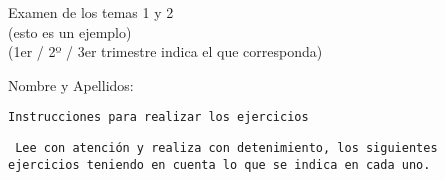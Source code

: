 \documentclass[12pt,a4papper,addpoints]{exam}
\begin{document}
%
%
\begin{center}
\Large{
Examen de los temas 1 y 2 \\ (esto es un ejemplo)
} \\
\vspace*{0.5cm}
\normalsize %
(1er / 2º / 3er trimestre indica el que corresponda)
\vspace*{0.5cm}
\\
%
\vspace{1.10cm}
	\begin{flushleft}
	Nombre y Apellidos: \hrulefill\\
	\vspace*{0.50cm}
		\begin{center}
		\small{\texttt{Instrucciones para realizar los ejercicios}}\\		
		\end{center}
	\vspace*{0.5cm}
%
\small{ %
\texttt{
Lee con atención y realiza con detenimiento, los siguientes ejercicios teniendo en cuenta lo que se indica en cada uno. \\
}} %
%
	\vspace*{0.75cm}		
 	\end{flushleft}
\end{center}
\end{document}
